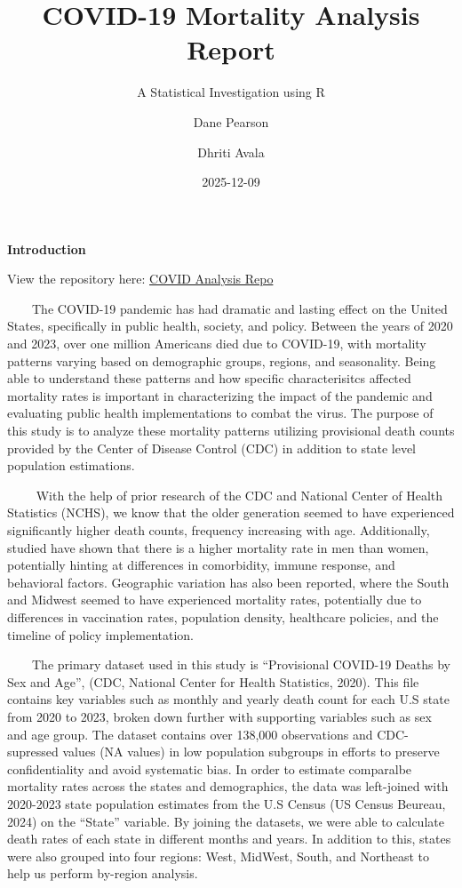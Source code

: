 \documentclass[
]{article}
\title{COVID-19 Mortality Analysis Report}
\subtitle{A Statistical Investigation using R}
\author{Dane Pearson \and Dhriti Avala}
\date{2025-12-09}
\begin{document}
\maketitle


\begin{center}
\textbf{\Large Introduction}
\end{center}

View the repository here:
\href{https://github.com/danepearson/Covid-Analysis-R}{COVID Analysis
Repo}

~~~~The COVID-19 pandemic has had dramatic and lasting effect on the
United States, specifically in public health, society, and policy.
Between the years of 2020 and 2023, over one million Americans died due
to COVID-19, with mortality patterns varying based on demographic
groups, regions, and seasonality. Being able to understand these
patterns and how specific characterisitcs affected mortality rates is
important in characterizing the impact of the pandemic and evaluating
public health implementations to combat the virus. The purpose of this
study is to analyze these mortality patterns utilizing provisional death
counts provided by the Center of Disease Control (CDC) in addition to
state level population estimations.

~~~~ With the help of prior research of the CDC and National Center of
Health Statistics (NCHS), we know that the older generation seemed to
have experienced significantly higher death counts, frequency increasing
with age. Additionally, studied have shown that there is a higher
mortality rate in men than women, potentially hinting at differences in
comorbidity, immune response, and behavioral factors. Geographic
variation has also been reported, where the South and Midwest seemed to
have experienced mortality rates, potentially due to differences in
vaccination rates, population density, healthcare policies, and the
timeline of policy implementation.

~~~~The primary dataset used in this study is ``Provisional COVID-19
Deaths by Sex and Age'', (CDC, National Center for Health Statistics,
2020). This file contains key variables such as monthly and yearly death
count for each U.S state from 2020 to 2023, broken down further with
supporting variables such as sex and age group. The dataset contains
over 138,000 observations and CDC-supressed values (NA values) in low
population subgroups in efforts to preserve confidentiality and avoid
systematic bias. In order to estimate comparalbe mortality rates across
the states and demographics, the data was left-joined with 2020-2023
state population estimates from the U.S Census (US Census Beureau, 2024)
on the ``State'' variable. By joining the datasets, we were able to
calculate death rates of each state in different months and years. In
addition to this, states were also grouped into four regions: West,
MidWest, South, and Northeast to help us perform by-region analysis.
\end{document}
